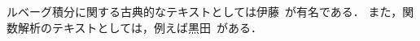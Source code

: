 \documentclass{jsarticle}
\begin{document}
ルベーグ積分に関する古典的なテキストとしては伊藤~\cite{伊藤}が有名である．
また，関数解析のテキストとしては，例えば黒田~\cite{黒田}がある．



\end{document}
